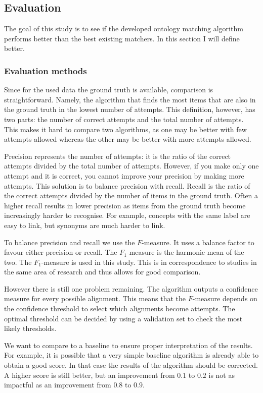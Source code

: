 \documentclass{article}
\begin{document}
 \subsection{Evaluation}
 The goal of this study is to see if the developed ontology matching algorithm performs better than the best existing matchers. In this section I will define better.
 \subsubsection{Evaluation methods} \label{EvaluationMethods}
 Since for the used data the ground truth is available, comparison is straightforward. Namely, the algorithm that finds the most items that are also in the ground truth in the lowest number of attempts. This definition, however, has two parts: the number of correct attempts and the total number of attempts. This makes it hard to compare two algorithms, as one may be better with few attempts allowed whereas the other may be better with more attempts allowed.
 
 Precision represents the number of attempts: it is the ratio of the correct attempts divided by the total number of attempts. However, if you make only one attempt and it is correct, you cannot improve your precision by making more attempts. This solution is to balance precision with recall. Recall is the ratio of the correct attempts divided by the number of items in the ground truth. Often a higher recall results in lower precision as items from the ground truth become increasingly harder to recognise. For example, concepts with the same label are easy to link, but synonyms are much harder to link. 
 
 To balance precision and recall we use the $F$-measure. It uses a balance factor to favour either precision or recall. The $F_1$-measure is the harmonic mean of the two. The $F_1$-measure is used in this study. This is in correspondence to studies in the same area of research and thus allows for good comparison.
 
 However there is still one problem remaining. The algorithm outputs a confidence measure for every possible alignment. This means that the $F$-measure depends on the confidence threshold to select which alignments become attempts. The optimal threshold can be decided by using a validation set to check the most likely thresholds.
 
 We want to compare to a baseline to ensure proper interpretation of the results. For example, it is possible that a very simple baseline algorithm is already able to obtain a good score. In that case the results of the algorithm should be corrected. A higher score is still better, but an improvement from $0.1$ to $0.2$ is not as impactful as an improvement from $0.8$ to $0.9$. 
 
\end{document}
